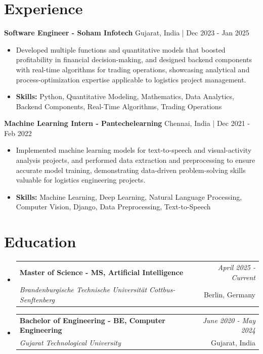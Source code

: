 \documentclass[a4paper,11pt]{article}
\makeatletter
\newcommand{\resumeSubheading}[4]{
\vspace{0.5mm}\item
    \begin{tabular*}{0.98\textwidth}[t]{l@{\extracolsep{\fill}}r}
        \textbf{#1} & \textit{\footnotesize{#4}} \\
        \textit{\footnotesize{#3}} &  \footnotesize{#2}\\
    \end{tabular*}
    \vspace{-2.4mm}
}
\makeatother
\begin{document}
\section{\textbf{Experience}}


\vspace{1mm}
  \textbf{Software Engineer - Soham Infotech} \hfill Gujarat, India | Dec 2023 - Jan 2025
\vspace{-1.5mm} %
\begin{itemize}
  \item Developed multiple functions and quantitative models that boosted profitability in financial decision-making, and designed backend components with real-time algorithms for trading operations, showcasing analytical and process-optimization expertise applicable to logistics project management.

\vspace{-2mm}
  \item \textbf{Skills:} Python, Quantitative Modeling, Mathematics, Data Analytics, Backend Components, Real-Time Algorithms, Trading Operations
\end{itemize}

\vspace{1mm}
  \textbf{Machine Learning Intern - Pantechelearning} \hfill Chennai, India | Dec 2021 - Feb 2022
\vspace{-1.5mm} %
\begin{itemize}
  \item Implemented machine learning models for text-to-speech and visual-activity analysis projects, and performed data extraction and preprocessing to ensure accurate model training, demonstrating data-driven problem-solving skills valuable for logistics engineering projects.
\vspace{-2mm}
  \item \textbf{Skills:} Machine Learning, Deep Learning, Natural Language Processing, Computer Vision, Django, Data Preprocessing, Text-to-Speech
\end{itemize}\section{\textbf{Education}}
\vspace{-0.4mm}

\begin{itemize}
\resumeSubheading
{Master of Science - MS, Artificial Intelligence }{Berlin, Germany}
{Brandenburgische Technische Universität Cottbus-Senftenberg  }{April 2025 - Current}

\vspace{1.0mm} %
\resumeSubheading
{Bachelor of Engineering - BE, Computer Engineering  }{Gujarat, India}
{Gujarat Technological University }{June 2020 - May 2024}

\end{itemize}
\end{document}
